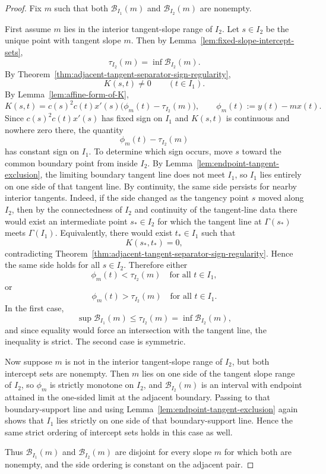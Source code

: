 \documentclass[11pt,a4paper]{amsart}
\theoremstyle{plain}
\theoremstyle{definition}
\begin{document}
\begin{proof}
Fix $m$ such that both $\mathcal B_{I_1}(m)$ and $\mathcal B_{I_2}(m)$
are nonempty.

First assume $m$ lies in the interior tangent-slope range of $I_2$. Let
$s\in I_2$ be the unique point with tangent slope $m$. Then by
Lemma~\ref{lem:fixed-slope-intercept-sets},
\[
\tau_{I_2}(m)=\inf \mathcal B_{I_2}(m).
\]
By Theorem~\ref{thm:adjacent-tangent-separator-sign-regularity},
\[
K(s,t)\neq 0
\qquad (t\in I_1).
\]
By Lemma~\ref{lem:affine-form-of-K},
\[
K(s,t)=c(s)^2c(t)x'(s)\bigl(\phi_m(t)-\tau_{I_2}(m)\bigr),
\qquad
\phi_m(t):=y(t)-mx(t).
\]
Since $c(s)^2c(t)x'(s)$ has fixed sign on $I_1$ and $K(s,t)$ is continuous
and nowhere zero there, the quantity
\[
\phi_m(t)-\tau_{I_2}(m)
\]
has constant sign on $I_1$. To determine which sign occurs, move $s$ toward
the common boundary point from inside $I_2$. By
Lemma~\ref{lem:endpoint-tangent-exclusion}, the limiting boundary tangent line
does not meet $I_1$, so $I_1$ lies entirely on one side of that tangent
line. By continuity, the same side persists for nearby interior tangents.
Indeed, if the side changed as the tangency point $s$ moved along $I_2$, then
by the connectedness of $I_2$ and continuity of the tangent-line data there
would exist an intermediate point $s_*\in I_2$ for which the tangent line at
$\Gamma(s_*)$ meets $\Gamma(I_1)$. Equivalently, there would exist
$t_*\in I_1$ such that
\[
K(s_*,t_*)=0,
\]
contradicting Theorem~\ref{thm:adjacent-tangent-separator-sign-regularity}.
Hence the same side holds for all $s\in I_2$. Therefore either
\[
\phi_m(t)<\tau_{I_2}(m)\quad\text{for all }t\in I_1,
\]
or
\[
\phi_m(t)>\tau_{I_2}(m)\quad\text{for all }t\in I_1.
\]
In the first case,
\[
\sup\mathcal B_{I_1}(m)\le \tau_{I_2}(m)=\inf\mathcal B_{I_2}(m),
\]
and since equality would force an intersection with the tangent line, the
inequality is strict. The second case is symmetric.

Now suppose $m$ is not in the interior tangent-slope range of $I_2$, but
both intercept sets are nonempty. Then $m$ lies on one side of the tangent
slope range of $I_2$, so $\phi_m$ is strictly monotone on $I_2$, and
$\mathcal B_{I_2}(m)$ is an interval with endpoint attained in the one-sided
limit at the adjacent boundary. Passing to that boundary-support line and using
Lemma~\ref{lem:endpoint-tangent-exclusion} again shows that $I_1$ lies
strictly on one side of that boundary-support line. Hence the same strict
ordering of intercept sets holds in this case as well.

Thus $\mathcal B_{I_1}(m)$ and $\mathcal B_{I_2}(m)$ are disjoint for every
slope $m$ for which both are nonempty, and the side ordering is constant on
the adjacent pair.
\end{proof}
\end{document}
